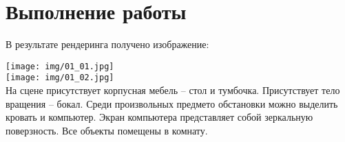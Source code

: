 \section{Выполнение работы}

В результате рендеринга получено изображение:

\texttt{[image: img/01\_01.jpg]}\\

\texttt{[image: img/01\_02.jpg]}\\

На сцене присутствует корпусная мебель -- стол и тумбочка. Присутствует тело вращения -- бокал. Среди произвольных предмето обстановки можно выделить кровать и компьютер. Экран компьютера представляет собой зеркальную поверзность. Все объекты помещены в комнату.

\pagebreak

